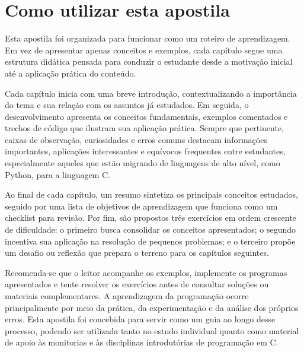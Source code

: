 \documentclass[12pt,a4paper,oneside]{extreport}
\begin{document}
\chapter*{Como utilizar esta apostila}

Esta apostila foi organizada para funcionar como um roteiro de aprendizagem. Em vez de apresentar apenas conceitos e exemplos, cada capítulo segue uma estrutura didática pensada para conduzir o estudante desde a motivação inicial até a aplicação prática do conteúdo.

Cada capítulo inicia com uma breve introdução, contextualizando a importância do tema e sua relação com os assuntos já estudados. Em seguida, o desenvolvimento apresenta os conceitos fundamentais, exemplos comentados e trechos de código que ilustram sua aplicação prática. Sempre que pertinente, caixas de observação, curiosidades e erros comuns destacam informações importantes, aplicações interessantes e equívocos frequentes entre estudantes, especialmente aqueles que estão migrando de linguagens de alto nível, como Python, para a linguagem C.

Ao final de cada capítulo, um resumo sintetiza os principais conceitos estudados, seguido por uma lista de objetivos de aprendizagem que funciona como um checklist para revisão. Por fim, são propostos três exercícios em ordem crescente de dificuldade: o primeiro busca consolidar os conceitos apresentados; o segundo incentiva sua aplicação na resolução de pequenos problemas; e o terceiro propõe um desafio ou reflexão que prepara o terreno para os capítulos seguintes.

Recomenda-se que o leitor acompanhe os exemplos, implemente os programas apresentados e tente resolver os exercícios antes de consultar soluções ou materiais complementares. A aprendizagem da programação ocorre principalmente por meio da prática, da experimentação e da análise dos próprios erros. Esta apostila foi concebida para servir como um guia ao longo desse processo, podendo ser utilizada tanto no estudo individual quanto como material de apoio às monitorias e às disciplinas introdutórias de programação em C.



\tableofcontents
\clearpage


\end{document}
